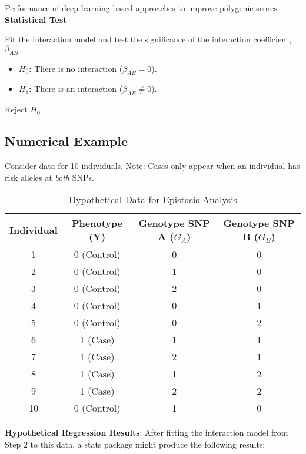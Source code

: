 \documentclass[twocolumn]{article}
\begin{document}
\begin{literaturepaper}{Performance of deep-learning-based approaches to improve polygenic scores \cite{Kelemen2025PolygenicScores}}
\textbf{Statistical Test}

Fit the interaction model and test the significance of the interaction coefficient, $\beta_{AB}$

\begin{itemize}
    \item \textbf{$H_0$:} There is no interaction ($\beta_{AB} = 0$).
    \item \textbf{$H_1$:} There is an interaction ($\beta_{AB} \neq 0$).
\end{itemize}

Reject $H_0$

\subsection*{Numerical Example}

Consider data for 10 individuals. Note: Cases only appear when an individual has risk alleles at \textit{both} SNPs.

\begin{table}[h!]
\centering
\caption{Hypothetical Data for Epistasis Analysis}
\begin{tabular}{cccc}
\toprule
\textbf{Individual} & \textbf{Phenotype (Y)} & \textbf{Genotype SNP A ($G_A$)} & \textbf{Genotype SNP B ($G_B$)} \\
\midrule
1 & 0 (Control) & 0 & 0 \\
2 & 0 (Control) & 1 & 0 \\
3 & 0 (Control) & 2 & 0 \\
4 & 0 (Control) & 0 & 1 \\
5 & 0 (Control) & 0 & 2 \\
6 & 1 (Case) & 1 & 1 \\
7 & 1 (Case) & 2 & 1 \\
8 & 1 (Case) & 1 & 2 \\
9 & 1 (Case) & 2 & 2 \\
10 & 0 (Control) & 1 & 0 \\
\bottomrule
\end{tabular}
\end{table}

\textbf{Hypothetical Regression Results}:
After fitting the interaction model from Step $2$ to this data, a stats package might produce the following results:


\end{literaturepaper}
\end{document}
